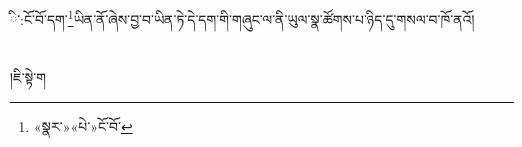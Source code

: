 ི་:ངོ་བོ་དག་\footnote{«སྣར་»«པེ་»ངོ་བོ་}ཡིན་ནོ་ཞེས་བྱ་བ་ཡིན་ཏེ་དེ་དག་གི་གཞུང་ལ་ནི་ཡུལ་སྣ་ཚོགས་པ་ཉིད་དུ་གསལ་བ་ཁོ་ནའོ།\chapter{ }།ཇི་སྟེ་ག